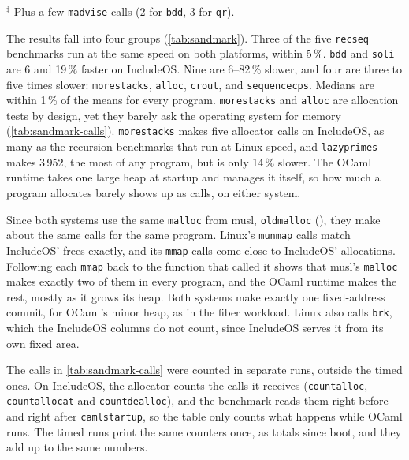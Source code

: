\documentclass[12pt]{report}
\newcommand{\fullref}[1]{\Cref{#1}}
\renewcommand{\_}{\origunderscore\allowbreak}
\begin{document}
\begin{table}[!htbp]
  \vspace{4pt}
  \raggedright\footnotesize
  $^\ddagger$ Plus a few \texttt{madvise} calls (2 for \texttt{bdd}, 3 for \texttt{qr}).
\end{table}

The results fall into four groups (\cref{tab:sandmark}). Three of the five \texttt{rec\_seq\_*} benchmarks run at the same speed on both platforms, within 5\,\%. \texttt{bdd} and \texttt{soli} are 6 and 19\,\% faster on IncludeOS. Nine are 6--82\,\% slower, and four are three to five times slower: \texttt{morestacks}, \texttt{alloc}, \texttt{crout}, and \texttt{sequence\_cps}. Medians are within 1\,\% of the means for every program. \texttt{morestacks} and \texttt{alloc} are allocation tests by design, yet they barely ask the operating system for memory (\cref{tab:sandmark-calls}). \texttt{morestacks} makes five allocator calls on IncludeOS, as many as the recursion benchmarks that run at Linux speed, and \texttt{lazy\_primes} makes 3\,952, the most of any program, but is only 14\,\% slower. The OCaml runtime takes one large heap at startup and manages it itself, so how much a program allocates barely shows up as calls, on either system.

Since both systems use the same \texttt{malloc} from musl, \texttt{oldmalloc} (\fullref{sec:memory-allocation}), they make about the same calls for the same program. Linux's \texttt{munmap} calls match IncludeOS' frees exactly, and its \texttt{mmap} calls come close to IncludeOS' allocations. Following each \texttt{mmap} back to the function that called it shows that musl's \texttt{malloc} makes exactly two of them in every program, and the OCaml runtime makes the rest, mostly as it grows its heap. Both systems make exactly one fixed-address commit, for OCaml's minor heap, as in the fiber workload. Linux also calls \texttt{brk}, which the IncludeOS columns do not count, since IncludeOS serves it from its own fixed area.

The calls in \cref{tab:sandmark-calls} were counted in separate runs, outside the timed ones. On IncludeOS, the allocator counts the calls it receives (\texttt{count\_alloc}, \texttt{count\_alloc\_at} and \texttt{count\_dealloc}), and the benchmark reads them right before and right after \texttt{caml\_startup}, so the table only counts what happens while OCaml runs. The timed runs print the same counters once, as totals since boot, and they add up to the same numbers.
\end{document}
